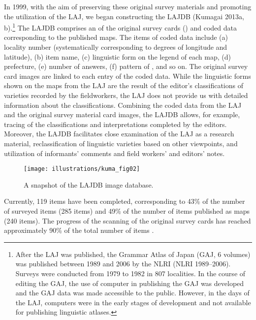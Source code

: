 \documentclass[output=paper]{LSP/langsci}
\begin{document}
In 1999, with the aim of preserving these original survey materials and promoting the utilization of the LAJ, we began constructing the LAJDB (Kumagai 2013a, b).\footnote{ After the LAJ was published, the Grammar Atlas of Japan (GAJ, 6 volumes) was published between 1989 and 2006 by the NLRI (NLRI 1989–2006). Surveys were conducted from 1979 to 1982 in 807 localities. In the course of editing the GAJ, the use of computer in publishing the GAJ was developed and the GAJ data was made accessible to the public. However, in the days of the LAJ, computers were in the early stages of development and not available for publishing linguistic atlases.} The LAJDB comprises an  of the original survey cards () and coded data corresponding to the published maps. The items of coded data include (a) locality number (systematically corresponding to degrees of longitude and latitude), (b) item name, (c) linguistic form on the legend of each map, (d) prefecture, (e) number of answers, (f) pattern of , and so on. The original survey card images are linked to each entry of the coded data. While the linguistic forms shown on the maps from the LAJ are the result of the editor’s classifications of varieties recorded by the fieldworkers, the LAJ does not provide us with detailed information about the classifications. Combining the coded data from the LAJ and the original survey material card images, the LAJDB allows, for example, tracing of the classifications and interpretations completed by the editors. Moreover, the LAJDB facilitates close examination of the LAJ as a research material, reclassification of linguistic varieties based on other viewpoints, and utilization of informants’ comments and field workers’ and editors’ notes.


\begin{figure}[t]
\texttt{[image: illustrations/kuma\_fig02]}
\caption{A snapshot of the LAJDB image database.}        
\label{fig:kuma:2}
\end{figure} 

Currently, 119 items have been completed, corresponding to 43\% of the number of surveyed items (285 items) and 49\% of the number of items published as maps (240 items). The progress of the scanning of the original survey cards has reached approximately 90\% of the total number of items \citep[159]{kumagai_daikibo_2013}.
\end{document}
